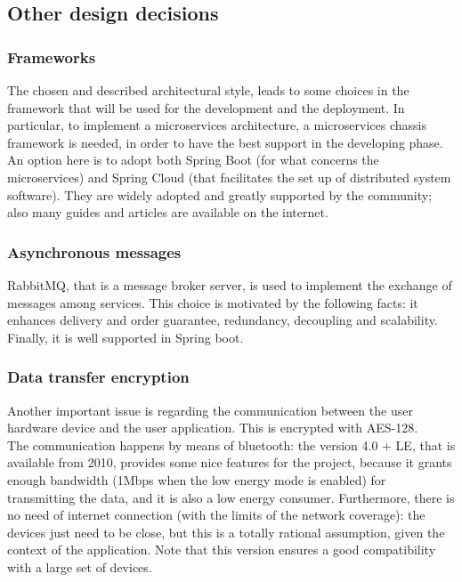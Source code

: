 \subsection{Other design decisions}
\subsubsection{Frameworks}
The chosen and described architectural style, leads to some choices in the framework that will be used for the development and the deployment. 
In particular, to implement a microservices architecture, a microservices chassis framework is needed, in order to have the best support 
in the developing phase. 
An option here is to adopt both Spring Boot (for what concerns the microservices) and Spring Cloud (that facilitates the set up of distributed
system software). They are widely adopted and greatly supported by the community; also many guides and articles are available on the internet. \\

\subsubsection{Asynchronous messages}
RabbitMQ, that is a message broker server, is used to implement the exchange of messages among services. This choice is motivated 
by the following facts: it enhances delivery and order guarantee, redundancy, decoupling and scalability. 
Finally, it is well supported in Spring boot. 

\subsubsection{Data transfer encryption}
Another important issue is regarding the communication between the user hardware device and the user application. This is encrypted with
AES-128. \\
The communication happens by means of bluetooth: the version 4.0 + LE, that is available from 2010, provides some nice features for the
project, because it grants enough bandwidth (1Mbps when the low energy mode is enabled) for transmitting the data, and it is also a low
energy consumer. Furthermore, there is no need of internet connection (with the limits of the network coverage): the devices just need to be
close, but this is a totally rational assumption, given the context of the application. 
Note that this version ensures a good compatibility with a large set of devices. 

